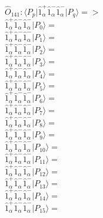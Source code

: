 \documentclass[14pt]{article}
\begin{document}
    $\hat{O}_{141}:  \langle{P_p}\vert \hat{1}_{\alpha}^{+}\hat{1}_{\alpha}^{-}\hat{1}_{\alpha}^{-} \vert{P_q}\rangle => $ \\ 
    $ \hat{1}_{\alpha}^{+}\hat{1}_{\alpha}^{-}\hat{1}_{\alpha}^{-} \vert{P_{0}}\rangle =  $ \\ 
    $ \hat{1}_{\alpha}^{+}\hat{1}_{\alpha}^{-}\hat{1}_{\alpha}^{-} \vert{P_{1}}\rangle =  $ \\ 
    $ \hat{1}_{\alpha}^{+}\hat{1}_{\alpha}^{-}\hat{1}_{\alpha}^{-} \vert{P_{2}}\rangle =  $ \\ 
    $ \hat{1}_{\alpha}^{+}\hat{1}_{\alpha}^{-}\hat{1}_{\alpha}^{-} \vert{P_{3}}\rangle =  $ \\ 
    $ \hat{1}_{\alpha}^{+}\hat{1}_{\alpha}^{-}\hat{1}_{\alpha}^{-} \vert{P_{4}}\rangle =  $ \\ 
    $ \hat{1}_{\alpha}^{+}\hat{1}_{\alpha}^{-}\hat{1}_{\alpha}^{-} \vert{P_{5}}\rangle =  $ \\ 
    $ \hat{1}_{\alpha}^{+}\hat{1}_{\alpha}^{-}\hat{1}_{\alpha}^{-} \vert{P_{6}}\rangle =  $ \\ 
    $ \hat{1}_{\alpha}^{+}\hat{1}_{\alpha}^{-}\hat{1}_{\alpha}^{-} \vert{P_{7}}\rangle =  $ \\ 
    $ \hat{1}_{\alpha}^{+}\hat{1}_{\alpha}^{-}\hat{1}_{\alpha}^{-} \vert{P_{8}}\rangle =  $ \\ 
    $ \hat{1}_{\alpha}^{+}\hat{1}_{\alpha}^{-}\hat{1}_{\alpha}^{-} \vert{P_{9}}\rangle =  $ \\ 
    $ \hat{1}_{\alpha}^{+}\hat{1}_{\alpha}^{-}\hat{1}_{\alpha}^{-} \vert{P_{10}}\rangle =  $ \\ 
    $ \hat{1}_{\alpha}^{+}\hat{1}_{\alpha}^{-}\hat{1}_{\alpha}^{-} \vert{P_{11}}\rangle =  $ \\ 
    $ \hat{1}_{\alpha}^{+}\hat{1}_{\alpha}^{-}\hat{1}_{\alpha}^{-} \vert{P_{12}}\rangle =  $ \\ 
    $ \hat{1}_{\alpha}^{+}\hat{1}_{\alpha}^{-}\hat{1}_{\alpha}^{-} \vert{P_{13}}\rangle =  $ \\ 
    $ \hat{1}_{\alpha}^{+}\hat{1}_{\alpha}^{-}\hat{1}_{\alpha}^{-} \vert{P_{14}}\rangle =  $ \\ 
    $ \hat{1}_{\alpha}^{+}\hat{1}_{\alpha}^{-}\hat{1}_{\alpha}^{-} \vert{P_{15}}\rangle =  $ \\ 
    
\end{document}

